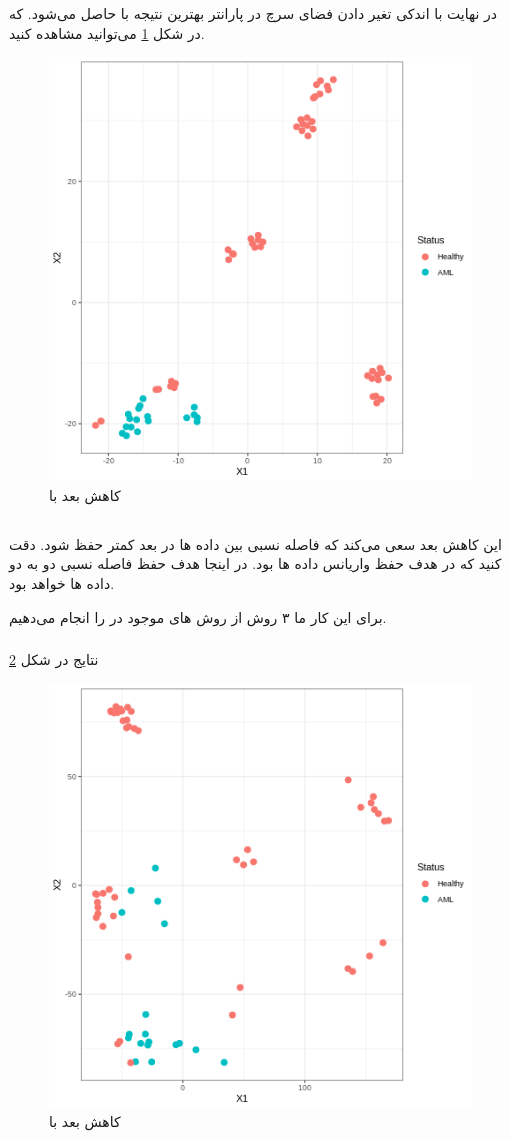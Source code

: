 \documentclass{article}
\begin{document}
در نهایت با اندکی تغیر دادن فضای سرچ در پارانتر  بهترین نتیجه با   
حاصل می‌شود.
که در شکل 
\ref{fig:prep8}
می‌توانید مشاهده کنید.
\begin{figure}[h!]
	\centering
	\includegraphics[width=0.5\columnwidth]{figs/prep8.png}
	\caption{کاهش بعد با }
	\label{fig:prep8}
\end{figure}
\subsection{}
این کاهش بعد سعی می‌کند که فاصله نسبی بین داده ها در بعد کمتر حفظ شود.
دقت کنید که در  هدف حفظ واریانس داده ها بود. در اینجا هدف حفظ فاصله نسبی دو به دو داده ها خواهد بود.

برای این کار ما ۳ روش از روش های موجود در 
را انجام می‌دهیم.
\subsubsection{}
نتایج در شکل \ref{fig:pco}
\begin{figure}[h!]
	\centering
	\includegraphics[width=0.5\columnwidth]{figs/pco.png}
	\caption{کاهش بعد با }
	\label{fig:pco}
\end{figure}
\end{document}
